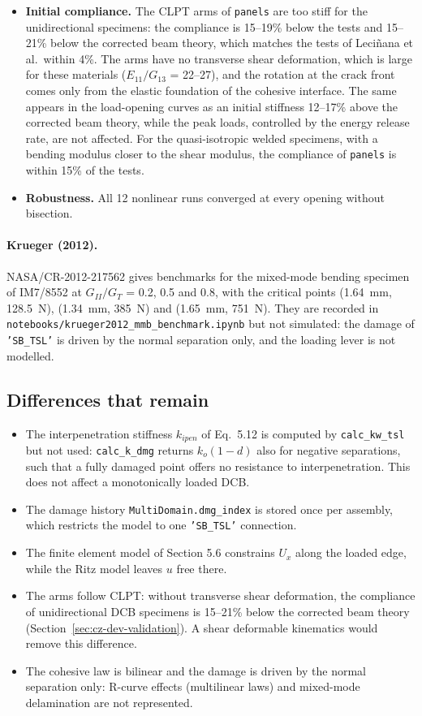 \begin{itemize}
	\item \textbf{Initial compliance.} The CLPT arms of \texttt{panels} are too stiff for the unidirectional specimens: the compliance is 15--19\% below the tests and 15--21\% below the corrected beam theory, which matches the tests of Leci\~nana et al.\ within 4\%. The arms have no transverse shear deformation, which is large for these materials ($E_{11}/G_{13}$ = 22--27), and the rotation at the crack front comes only from the elastic foundation of the cohesive interface. The same appears in the load-opening curves as an initial stiffness 12--17\% above the corrected beam theory, while the peak loads, controlled by the energy release rate, are not affected. For the quasi-isotropic welded specimens, with a bending modulus closer to the shear modulus, the compliance of \texttt{panels} is within 15\% of the tests.
	\item \textbf{Robustness.} All 12 nonlinear runs converged at every opening without bisection.
\end{itemize}

\paragraph{Krueger (2012).} NASA/CR-2012-217562 gives benchmarks for the mixed-mode bending specimen of IM7/8552 at $G_{II}/G_T$ = 0.2, 0.5 and 0.8, with the critical points (1.64~mm, 128.5~N), (1.34~mm, 385~N) and (1.65~mm, 751~N). They are recorded in \texttt{notebooks/krueger2012\_mmb\_benchmark.ipynb} but not simulated: the damage of \texttt{'SB\_TSL'} is driven by the normal separation only, and the loading lever is not modelled.

\subsection{Differences that remain}\label{sec:cz-dev-open}

\begin{itemize}
	\item The interpenetration stiffness $k_{ipen}$ of Eq.~5.12 is computed by \texttt{calc\_kw\_tsl} but not used: \texttt{calc\_k\_dmg} returns $k_o(1-d)$ also for negative separations, such that a fully damaged point offers no resistance to interpenetration. This does not affect a monotonically loaded DCB.
	\item The damage history \texttt{MultiDomain.dmg\_index} is stored once per assembly, which restricts the model to one \texttt{'SB\_TSL'} connection.
	\item The finite element model of Section 5.6 constrains $U_x$ along the loaded edge, while the Ritz model leaves $u$ free there.
	\item The arms follow CLPT: without transverse shear deformation, the compliance of unidirectional DCB specimens is 15--21\% below the corrected beam theory (Section~\ref{sec:cz-dev-validation}). A shear deformable kinematics would remove this difference.
	\item The cohesive law is bilinear and the damage is driven by the normal separation only: R-curve effects (multilinear laws) and mixed-mode delamination are not represented.
\end{itemize}
